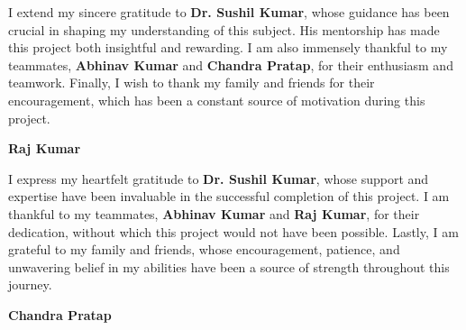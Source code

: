 	\vspace{0.2cm} 
	
	I extend my sincere gratitude to \textbf{Dr. Sushil Kumar}, whose guidance has been crucial in shaping my understanding of this subject. His mentorship has made this project both insightful and rewarding. I am also immensely thankful to my teammates, \textbf{Abhinav Kumar} and \textbf{Chandra Pratap}, for their enthusiasm and teamwork. Finally, I wish to thank my family and friends for their encouragement, which has been a constant source of motivation during this project.
	
	\vspace{0.1cm} 
	\hfill \textbf{Raj Kumar} 
	
	\vspace{0.2cm} 
	
	I express my heartfelt gratitude to \textbf{Dr. Sushil Kumar}, whose support and expertise have been invaluable in the successful completion of this project. I am thankful to my teammates, \textbf{Abhinav Kumar} and \textbf{Raj Kumar}, for their dedication, without which this project would not have been possible. Lastly, I am grateful to my family and friends, whose encouragement, patience, and unwavering belief in my abilities have been a source of strength throughout this journey.
	
	\vspace{0.2cm} 
	\hfill \textbf{Chandra Pratap} 


